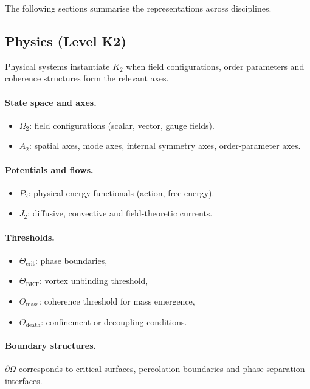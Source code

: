 The following sections summarise the representations across disciplines.

\subsection{Physics (Level K2)}

Physical systems instantiate \(K_2\) when field configurations, order
parameters and coherence structures form the relevant axes.

\paragraph{State space and axes.}
\begin{itemize}
  \item \(\Omega_{2}\): field configurations (scalar, vector, gauge fields).
  \item \(A_{2}\): spatial axes, mode axes, internal symmetry axes,
        order-parameter axes.
\end{itemize}

\paragraph{Potentials and flows.}
\begin{itemize}
  \item \(P_2\): physical energy functionals (action, free energy).
  \item \(J_2\): diffusive, convective and field-theoretic currents.
\end{itemize}

\paragraph{Thresholds.}
\begin{itemize}
  \item \(\Theta_{\mathrm{crit}}\): phase boundaries,
  \item \(\Theta_{\mathrm{BKT}}\): vortex unbinding threshold,
  \item \(\Theta_{\mathrm{mass}}\): coherence threshold for mass emergence,
  \item \(\Theta_{\mathrm{death}}\): confinement or decoupling conditions.
\end{itemize}

\paragraph{Boundary structures.}
\(\partial\Omega\) corresponds to critical surfaces, percolation boundaries and
phase-separation interfaces.

